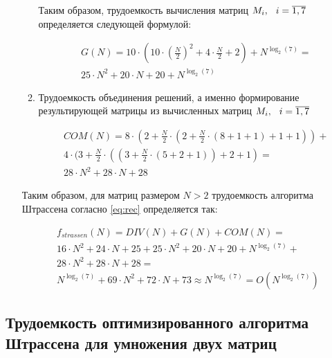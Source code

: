 \begin{itemize}[label=---]
\begin{enumerate}[label={\arabic*)}]
		Таким образом, трудоемкость вычисления матриц $M_i, \hspace{0.25cm} i = \overline{1, 7}$ определяется следующей формулой:
		
		\begin{equation}
			\label{eq:Gfinish}
			\begin{gathered}
				G(N) = 10 \cdot (10 \cdot (\frac{N}{2})^2 + 4 \cdot \frac{N}{2} + 2) + N^{\log_2(7)} = \\
				25 \cdot N^2 + 20 \cdot N + 20 + N^{\log_2(7)}
			\end{gathered}
		\end{equation}
		
		\item Трудоемкость объединения решений, а именно формирование результирующей матрицы из вычисленных матриц $M_i, \hspace{0.25cm} i = \overline{1, 7}$
		
		\begin{equation}
			\label{eq:com}
			\begin{gathered}
				COM(N) = 8 \cdot (2 + \frac{N}{2} \cdot (2 + \frac{N}{2} \cdot (8 + 1 + 1) + 1 + 1)) + \\
				4 \cdot (3 + \frac{N}{2} \cdot ((3 + \frac{N}{2} \cdot (5 + 2 + 1)) + 2 + 1) = \\
				28 \cdot N^2 + 28 \cdot N + 28
			\end{gathered}
		\end{equation}	
	\end{enumerate}
	
	Таким образом, для матриц размером $N > 2$ трудоемкость алгоритма Штрассена согласно \ref{eq:rec} определяется так:
	
	\begin{equation}
		\label{eq:com}
		\begin{gathered}
			f_{strassen}(N) = DIV(N) + G(N) + COM(N) = \\ 16 \cdot N^2 + 24 \cdot N + 25 + 25 \cdot N^2 + 20 \cdot N + 20 + N^{\log_2(7)} + \\
		    28 \cdot N^2 + 28 \cdot N + 28 = \\
		    N^{\log_2(7)} + 69 \cdot N^2 + 72 \cdot N + 73 \approx N^{\log_2(7)} = O(N^{\log_2(7)})
		\end{gathered}
	\end{equation}
\end{itemize}

\subsection{Трудоемкость оптимизированного алгоритма Штрассена для умножения двух матриц}

